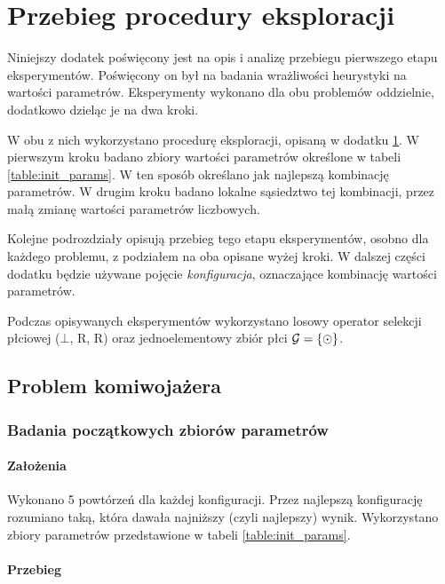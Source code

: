 \documentclass[./FM_mgr.tex]{subfiles}
\begin{document}
\section{Przebieg procedury eksploracji} \label{appendix:explore_flow}

Niniejszy dodatek poświęcony jest na opis i analizę przebiegu pierwszego etapu eksperymentów.
Poświęcony on był na badania wrażliwości heurystyki na wartości parametrów.
Eksperymenty wykonano dla obu problemów oddzielnie, dodatkowo dzieląc je na dwa kroki.

W obu z nich wykorzystano procedurę eksploracji, opisaną w dodatku \ref{appendix:explore_flow}.
W pierwszym kroku badano zbiory wartości parametrów określone w tabeli \ref{table:init_params}.
W ten sposób określano jak najlepszą kombinację parametrów.
W drugim kroku badano lokalne sąsiedztwo tej kombinacji, przez małą zmianę wartości parametrów liczbowych.

Kolejne podrozdziały opisują przebieg tego etapu eksperymentów, osobno dla każdego problemu, z podziałem na oba opisane wyżej kroki.
W dalszej części dodatku będzie używane pojęcie \emph{konfiguracja}, oznaczające kombinację wartości parametrów.

Podczas opisywanych eksperymentów wykorzystano losowy operator selekcji płciowej ($\bot$, R, R) oraz jednoelementowy zbiór płci $\mathcal{G}=\{ \odot \}$.

\subsection{Problem komiwojażera}

\subsubsection{Badania początkowych zbiorów parametrów}

\paragraph{Założenia} Wykonano 5 powtórzeń dla każdej konfiguracji.
Przez najlepszą konfigurację rozumiano taką, która dawała najniższy (czyli najlepszy) wynik.
Wykorzystano zbiory parametrów przedstawione w tabeli \ref{table:init_params}.

\paragraph{Przebieg}
\end{document}
